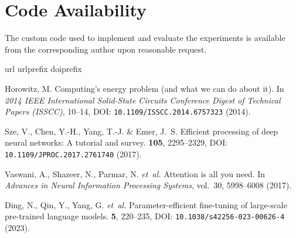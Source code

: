 \documentclass[fleqn,10pt]{wlscirep}
\begin{document}
\section*{Code Availability}
The custom code used to implement and evaluate the experiments is available
from the corresponding author upon reasonable request.
%
  \begin{thebibliography}{99}
  \expandafter\ifx\csname url\endcsname\relax
    \def\url#1{\texttt{#1}}\fi
  \expandafter\ifx\csname urlprefix\endcsname\relax\def\urlprefix{URL }\fi
  \expandafter\ifx\csname doiprefix\endcsname\relax\def\doiprefix{DOI: }\fi
  \providecommand{\bibinfo}[2]{#2}
  \providecommand{\eprint}[2][]{\url{#2}}

  \bibinfo{author}{Horowitz, M.}
  \newblock \bibinfo{title}{1.1 {Computing's} energy problem (and what we can do
    about it)}.
  \newblock In \emph{\bibinfo{booktitle}{2014 IEEE International Solid-State
    Circuits Conference Digest of Technical Papers (ISSCC)}},
    \bibinfo{pages}{10--14}, \doiprefix\url{10.1109/ISSCC.2014.6757323}
    (\bibinfo{year}{2014}).

  \bibinfo{author}{Sze, V.}, \bibinfo{author}{Chen, Y.-H.},
    \bibinfo{author}{Yang, T.-J.} \& \bibinfo{author}{Emer, J.~S.}
  \newblock \bibinfo{journal}{\bibinfo{title}{Efficient processing of deep neural
    networks: A tutorial and survey}}.
    \textbf{\bibinfo{volume}{105}}, \bibinfo{pages}{2295--2329},
    \doiprefix\url{10.1109/JPROC.2017.2761740} (\bibinfo{year}{2017}).

  \bibinfo{author}{Vaswani, A.}, \bibinfo{author}{Shazeer, N.},
    \bibinfo{author}{Parmar, N.} \emph{et~al.}
  \newblock \bibinfo{title}{Attention is all you need}.
  \newblock In \emph{\bibinfo{booktitle}{Advances in Neural Information
    Processing Systems}}, vol.~\bibinfo{volume}{30},
    \bibinfo{pages}{5998--6008} (\bibinfo{year}{2017}).

  \bibinfo{author}{Ding, N.}, \bibinfo{author}{Qin, Y.}, \bibinfo{author}{Yang,
    G.} \emph{et~al.}
  \newblock \bibinfo{journal}{\bibinfo{title}{Parameter-efficient fine-tuning of
    large-scale pre-trained language models}}.
    \textbf{\bibinfo{volume}{5}}, \bibinfo{pages}{220--235},
    \doiprefix\url{10.1038/s42256-023-00626-4} (\bibinfo{year}{2023}).


\end{thebibliography}
\end{document}
